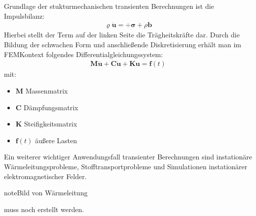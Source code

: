 \documentclass[letterpaper,10pt,german]{jupyterBook}
\begin{document}
\sphinxAtStartPar
Grundlage der stukturmechanischen transienten Berechnungen ist die Impulsbilanz:
\begin{equation}\label{equation:chapters/chapter6/Overview:Impulsbilanz_dynamisch}
\begin{split}\varrho \ddot{\bm{u}} =\div{\bm{\sigma}} + \rho \bm{b} \end{split}
\end{equation}
\sphinxAtStartPar
Hierbei stellt der Term auf der linken Seite die Trägheitskräfte dar. Durch die Bildung der schwachen Form und anschließende Diskretisierung erhält man im FEM\sphinxhyphen{}Kontext folgendes Differentialgleichungssystem:
\begin{equation}\label{equation:chapters/chapter6/Overview:FEM_dynamisch}
\begin{split}\bm{M} \ddot{\bm{u}} + \bm{C} \dot{\bm{u}} + \bm{K} \bm{u} = \bm{f}(t)\end{split}
\end{equation}
\sphinxAtStartPar
mit:
\begin{itemize}
\item {} 
\sphinxAtStartPar
\(\bm{M}\) \sphinxhyphen{} Massenmatrix

\item {} 
\sphinxAtStartPar
\(\bm{C}\) \sphinxhyphen{} Dämpfungsmatrix

\item {} 
\sphinxAtStartPar
\(\bm{K}\) \sphinxhyphen{} Steifigkeitsmatrix

\item {} 
\sphinxAtStartPar
\(\bm{f}(t)\) \sphinxhyphen{} äußere Lasten

\end{itemize}

\sphinxAtStartPar
Ein weiterer wichtiger Anwendungsfall transienter Berechnungen sind instationäre Wärmeleitungsprobleme, Stofftransportprobleme und Simulationen instationärer elektro\sphinxhyphen{}magnetischer Felder.

\begin{sphinxadmonition}{note}{Bild von Wärmeleitung}

\sphinxAtStartPar
muss noch erstellt werden.
\end{sphinxadmonition}

\sphinxstepscope
\end{document}
